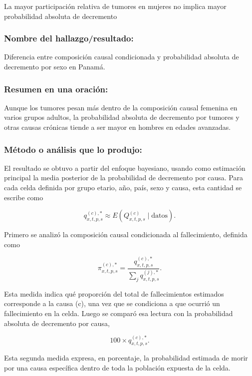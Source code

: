 \documentclass[
  spanish,
  letterpaper,
  DIV=11,
  numbers=noendperiod]{scrartcl}
\begin{document}
La mayor participación relativa de tumores en mujeres no implica mayor
probabilidad absoluta de decremento

\subsubsection{Nombre del
hallazgo/resultado:}\label{nombre-del-hallazgoresultado-3}

Diferencia entre composición causal condicionada y probabilidad absoluta
de decremento por sexo en Panamá.

\subsubsection{Resumen en una
oración:}\label{resumen-en-una-oraciuxf3n-3}

Aunque los tumores pesan más dentro de la composición causal femenina en
varios grupos adultos, la probabilidad absoluta de decremento por
tumores y otras causas crónicas tiende a ser mayor en hombres en edades
avanzadas.

\subsubsection{Método o análisis que lo
produjo:}\label{muxe9todo-o-anuxe1lisis-que-lo-produjo-3}

El resultado se obtuvo a partir del enfoque bayesiano, usando como
estimación principal la media posterior de la probabilidad de decremento
por causa. Para cada celda definida por grupo etario, año, país, sexo y
causa, esta cantidad se escribe como

\[
q^{(c),*}_{x,t,p,s}
\approx
E\left(Q^{(c)}_{x,t,p,s}\mid \text{datos}\right).
\]

Primero se analizó la composición causal condicionada al fallecimiento,
definida como

\[
\pi^{(c),*}_{x,t,p,s}
=
\frac{
q^{(c),*}_{x,t,p,s}
}{
\sum_j q^{(j),*}_{x,t,p,s}
}.
\]

Esta medida indica qué proporción del total de fallecimientos estimados
corresponde a la causa (c), una vez que se condiciona a que ocurrió un
fallecimiento en la celda. Luego se comparó esa lectura con la
probabilidad absoluta de decremento por causa,

\[
100 \times q^{(c),*}_{x,t,p,s}.
\]

Esta segunda medida expresa, en porcentaje, la probabilidad estimada de
morir por una causa específica dentro de toda la población expuesta de
la celda.
\end{document}
